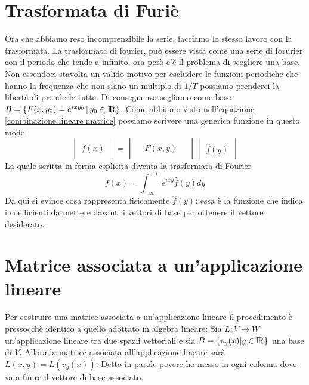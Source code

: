 \documentclass[11pt,a4paper]{report}
\theoremstyle{definition}
\theoremstyle{plain}
\theoremstyle{plain}
\begin{document}
		\section{Trasformata di Furiè}
			Ora che abbiamo reso incomprenzibile la serie, facciamo lo stesso lavoro con la trasformata.\newline \newline
			La trasformata di fourier, può essere vista come una serie di forurier con il periodo che tende a infinito, ora però c'è il problema di scegliere una base.\newline
			Non essendoci stavolta un valido motivo per escludere le funzioni periodiche che hanno la frequenza che non siano un multiplo di $1/T$ possiamo prenderci la libertà di prenderle tutte. Di conseguenza segliamo come base $B=\{F(x,y_0)=e^{ixy_0}\,|\,y_0 \in \rm I\!R \}$.\newline
			Come abbiamo visto nell'equazione \ref{combinazione lineare matrice} possiamo scrivere una generica funzione in questo modo
			\begin{equation}
				\begin{vmatrix}
					\\
					f(x)\\
					\quad
				\end{vmatrix}
				=
				\begin{vmatrix}
					\, & & \, \\
					& F(x,y) & \\
					& & 
				\end{vmatrix}
				\begin{vmatrix}
					\\
					\hat{f}(y)\\
					\quad
				\end{vmatrix}
			\end{equation}
			La quale scritta in forma esplicita diventa la trasformata di Fourier
			\begin{equation}
			f(x)=\int_{-\infty}^{+\infty} e^{ixy}\hat{f}(y) dy
			\end{equation}
			Da qui si evince cosa rappresenta fisicamente $\hat{f}(y)$: essa è la funzione che indica i coefficienti da mettere davanti i vettori di base per ottenere il vettore desiderato.




		\section{Matrice associata a un'applicazione lineare}
			Per costruire una matrice associata a un'applicazione lineare il procedimento è pressocchè identico a quello adottato in algebra lineare:\newline
			Sia $L:V\rightarrow W$ un'applicazione lineare tra due spazii vettoriali e sia $B=\{v_{y}(x)|y\in \rm I\!R\}$ una base di $V$. Allora la matrice associata all'applicazione lineare sarà $L(x,y)=L(v_{y}(x))$.\newline
			Detto in parole povere ho messo in ogni colonna dove va a finire il vettore di base associato.\newline
\end{document}
